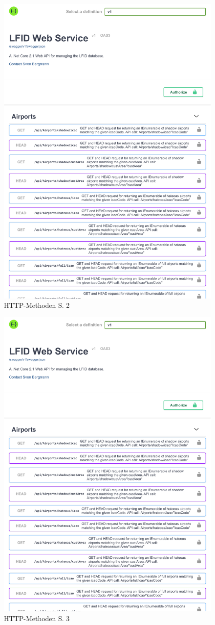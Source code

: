 	\begin{figure}[htp]
		\centering
		\caption{HTTP-Methoden S. 2\label{fig:http-methoden-S2}}
		\includegraphics[page=2,width=.9\textwidth]{include/img/SwaggerUI}
	\end{figure}

	\begin{figure}[htp]
		\centering
		\caption{HTTP-Methoden S. 3\label{fig:http-methoden-S3}}
		\includegraphics[page=3,width=.9\textwidth]{include/img/SwaggerUI}
	\end{figure}
